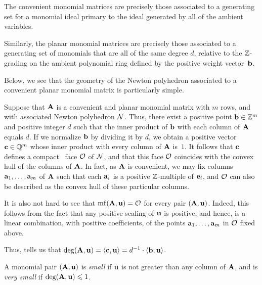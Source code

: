 \documentclass{article}
\begin{document}
\begin{remark} The convenient monomial matrices are precisely those associated to a generating set for a monomial ideal primary to the ideal generated by all of the ambient variables.  

Similarly, the planar monomial matrices are precisely those associated to a generating set of monomials that are all of the same degree $d$, relative to the $\mathbb{Z}$-grading on the ambient polynomial ring defined by the positive weight vector~$\mathbf{b}$.
\end{remark}

Below, we see that the  geometry of the Newton polyhedron associated to a convenient planar monomial matrix is particularly simple.

\begin{example}
   \label{ex: convenient planar case}   
Suppose that $\mathbf{A}$ is a convenient and planar monomial matrix with $m$ rows, and with associated Newton polyhedron $\mathcal{N}$.     
Thus, there exist a positive point $\mathbf{b} \in \mathbb{Z}^m$ and positive integer $d$ such that the inner product of $\mathbf{b}$ with each column of $\mathbf{A}$ equals $d$.  If we normalize  $\mathbf{b}$ by dividing it by $d$, we obtain a positive vector $\mathbf{c} \in \mathbb{Q}^m$ whose inner product with every column of $\mathbf{A}$ is~$1$.  It follows that $\mathbf{c}$ defines a compact \positive\ face $\mathcal{O}$ of $\mathcal{N}$, and that this face $\mathcal{O}$ coincides with the convex hull of the columns of $\mathbf{A}$.
In fact, as $\mathbf{A}$ is convenient, we may fix columns $\mathbf{a}_1, \ldots, \mathbf{a}_m$ of $\mathbf{A}$ such that each $\mathbf{a}_i$ is a positive $\mathbb{Z}$-multiple of $\mathbf{e}_i$, and $\mathcal{O}$ can also be described as the convex hull of these particular columns.   
   
It is also not hard to see that $\operatorname{mf}(\mathbf{A}, \mathbf{u}) = \mathcal{O}$ for every pair $(\mathbf{A}, \mathbf{u})$.  Indeed, this follows from the fact that any positive scaling of $\mathbf{u}$ is positive, and hence, is a linear combination, with positive coefficients,  of the points $\mathbf{a}_1, \ldots, \mathbf{a}_m$ in $\mathcal{O}$ fixed above. 

Thus,  tells us that $\deg(\mathbf{A}, \mathbf{u}) = \langle \mathbf{c}, \mathbf{u} \rangle = d^{-1} \cdot \langle \mathbf{b}, \mathbf{u} \rangle$.
\end{example}

\begin{definition}
   \label{defn: small and very small pairs}
A monomial pair $(\mathbf{A}, \mathbf{u})$ is \emph{small} if $\mathbf{u}$ is not greater than any column of $\mathbf{A}$, and is \emph{very small} if $\operatorname{deg}(\mathbf{A},\mathbf{u}) \leqslant 1$.
\end{definition}
\end{document}
